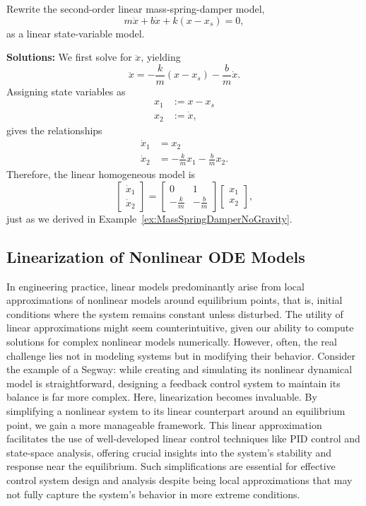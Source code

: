 \bigskip

\begin{example} Rewrite the second-order linear mass-spring-damper model,
$$ m \ddot{x} + b \dot{x} + k\left( x-x_s\right) = 0,$$
as a linear state-variable model.    
\end{example}
\textbf{Solutions:}
We first solve for $ \ddot{x}$, yielding
$$ \ddot{x} = - \frac{k}{m} \left( x-x_s\right) -\frac{b}{m} \dot{x}.$$
Assigning state variables as
\begin{align*}
            x_1 &:= x - x_s \\
        x_2 & := \dot{x},
\end{align*}
gives the relationships
\begin{align*}
   \dot{x}_1 &= x_2\\
 \dot{x}_2 &= -\frac{k}{m} x_1 - \frac{b}{m} x_2. 
\end{align*}
Therefore, the linear homogeneous model is
$$
\left[ \begin{array}{c} \dot{x}_1  \\ \dot{x}_2 \end{array} \right] = \left[ \begin{array}{cc} 0 & 1\\- \frac{k}{m} & -\frac{b}{m} \end{array}\right] \left[ \begin{array}{c} x_1  \\ x_2 \end{array}\right],
$$
just as we derived in Example~\ref{ex:MassSpringDamperNoGravity}.

\Qed

\subsection{Linearization of Nonlinear ODE Models}

In engineering practice, linear models predominantly arise from local approximations of nonlinear models around equilibrium points, that is, initial conditions where the system remains constant unless disturbed. The utility of linear approximations might seem counterintuitive, given our ability to compute solutions for complex nonlinear models numerically. However, often, the real challenge lies not in modeling systems but in modifying their behavior. Consider the example of a Segway: while creating and simulating its nonlinear dynamical model is straightforward, designing a feedback control system to maintain its balance is far more complex. Here, linearization becomes invaluable. By simplifying a nonlinear system to its linear counterpart around an equilibrium point, we gain a more manageable framework. This linear approximation facilitates the use of well-developed linear control techniques like PID control and state-space analysis, offering crucial insights into the system's stability and response near the equilibrium. Such simplifications are essential for effective control system design and analysis despite being local approximations that may not fully capture the system's behavior in more extreme conditions.

